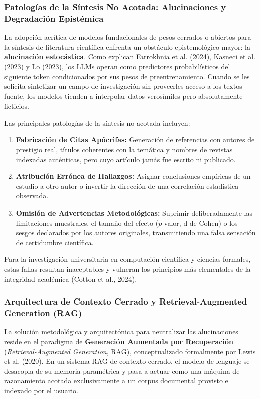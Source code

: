\subsubsection{Patologías de la Síntesis No Acotada: Alucinaciones y Degradación Epistémica}

La adopción acrítica de modelos fundacionales de pesos cerrados o abiertos para la síntesis de literatura científica enfrenta un obstáculo epistemológico mayor: la \textbf{alucinación estocástica}. Como explican Farrokhnia et al. (2024), Kasneci et al. (2023) y Lo (2023), los LLMs operan como predictores probabilísticos del siguiente token condicionados por sus pesos de preentrenamiento. Cuando se les solicita sintetizar un campo de investigación sin proveerles acceso a los textos fuente, los modelos tienden a interpolar datos verosímiles pero absolutamente ficticios.

Las principales patologías de la síntesis no acotada incluyen:

\begin{enumerate}
    \item \textbf{Fabricación de Citas Apócrifas:} Generación de referencias con autores de prestigio real, títulos coherentes con la temática y nombres de revistas indexadas auténticas, pero cuyo artículo jamás fue escrito ni publicado.
    \item \textbf{Atribución Errónea de Hallazgos:} Asignar conclusiones empíricas de un estudio a otro autor o invertir la dirección de una correlación estadística observada.
    \item \textbf{Omisión de Advertencias Metodológicas:} Suprimir deliberadamente las limitaciones muestrales, el tamaño del efecto ($p$-valor, d de Cohen) o los sesgos declarados por los autores originales, transmitiendo una falsa sensación de certidumbre científica.
\end{enumerate}

Para la investigación universitaria en computación científica y ciencias formales, estas fallas resultan inaceptables y vulneran los principios más elementales de la integridad académica (Cotton et al., 2024).

\subsubsection{Arquitectura de Contexto Cerrado y Retrieval-Augmented\\ Generation (RAG)}

La solución metodológica y arquitectónica para neutralizar las alucinaciones reside en el paradigma de \textbf{Generación Aumentada por Recuperación} (\textit{Retrieval-Augmented Generation}, RAG), conceptualizado formalmente por Lewis et al. (2020). En un sistema RAG de contexto cerrado, el modelo de lenguaje se desacopla de su memoria paramétrica y pasa a actuar como una máquina de razonamiento acotada exclusivamente a un corpus documental provisto e indexado por el usuario.

